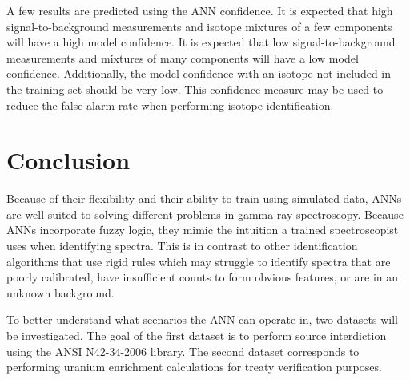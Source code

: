 \documentclass[tocnosub,noragright,centerchapter,12pt,fullpage]{uiucecethesis09}
\begin{document}
A few results are predicted using the ANN confidence. It is expected that high signal-to-background measurements and isotope mixtures of a few components will have a high model confidence. It is expected that low signal-to-background measurements and mixtures of many components will have a low model confidence. Additionally, the model confidence with an isotope not included in the training set should be very low. This confidence measure may be used to reduce the false alarm rate when performing isotope identification. 
 \fi





\chapter{Conclusion}

Because of their flexibility and their ability to train using simulated data, ANNs are well suited to solving different problems in gamma-ray spectroscopy. Because ANNs incorporate fuzzy logic, they mimic the intuition a trained spectroscopist uses when identifying spectra. This is in contrast to other identification algorithms that use rigid rules which may struggle to identify spectra that are poorly calibrated, have insufficient counts to form obvious features, or are in an unknown background. 

To better understand what scenarios the ANN can operate in, two datasets will be investigated. The goal of the first dataset is to perform source interdiction using the ANSI N42-34-2006 library. The second dataset corresponds to performing uranium enrichment calculations for treaty verification purposes. %
\end{document}
